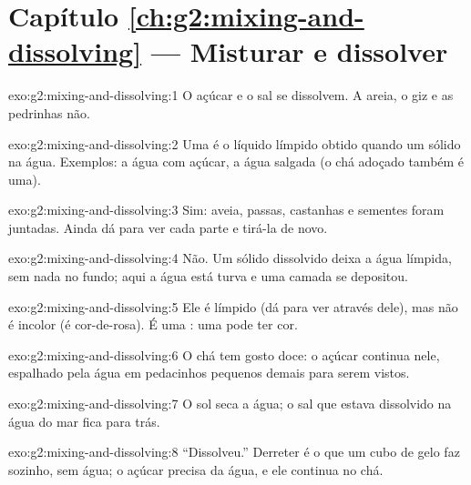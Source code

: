 \section*{Capítulo \ref{ch:g2:mixing-and-dissolving} --- Misturar e dissolver}

\begin{solution}{exo:g2:mixing-and-dissolving:1}
O açúcar e o sal se dissolvem. A areia, o giz e as pedrinhas não.
\end{solution}

\begin{solution}{exo:g2:mixing-and-dissolving:2}
Uma  é o líquido límpido obtido quando um sólido  na
água. Exemplos: a água com açúcar, a água salgada (o chá adoçado também é uma).
\end{solution}

\begin{solution}{exo:g2:mixing-and-dissolving:3}
Sim: aveia, passas, castanhas e sementes foram juntadas. Ainda dá para
ver cada parte e tirá-la de novo.
\end{solution}

\begin{solution}{exo:g2:mixing-and-dissolving:4}
Não. Um sólido dissolvido deixa a água límpida, sem nada no fundo; aqui
a água está turva e uma camada se depositou.
\end{solution}

\begin{solution}{exo:g2:mixing-and-dissolving:5}
Ele é límpido (dá para ver através dele), mas não é incolor (é
cor-de-rosa). É uma : uma  pode ter cor.
\end{solution}

\begin{solution}{exo:g2:mixing-and-dissolving:6}
O chá tem gosto doce: o açúcar continua nele, espalhado pela água em
pedacinhos pequenos demais para serem vistos.
\end{solution}

\begin{solution}{exo:g2:mixing-and-dissolving:7}
O sol seca a água; o sal que estava dissolvido na água do mar fica para
trás.
\end{solution}

\begin{solution}{exo:g2:mixing-and-dissolving:8}
``Dissolveu.'' Derreter é o que um cubo de gelo faz sozinho, sem água;
o açúcar precisa da água, e ele continua no chá.
\end{solution}

